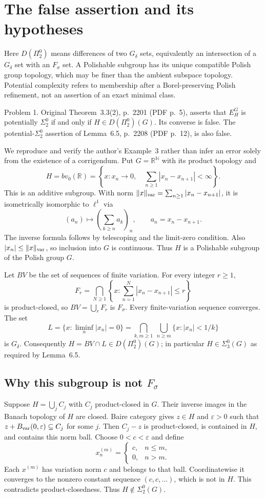 \documentclass[10pt]{article}
\begin{document}
\section*{The false assertion and its hypotheses}
Here \(D(\Pi^0_2)\) means differences of two \(G_\delta\) sets, equivalently an intersection of a \(G_\delta\) set with an \(F_\sigma\) set. A Polishable subgroup has its unique compatible Polish group topology, which may be finer than the ambient subspace topology. Potential complexity refers to membership after a Borel-preserving Polish refinement, not an assertion of an exact minimal class.\par
Problem 1.  Original Theorem 3.3(2), p. 2201 (PDF p. 5), asserts that \(E_H^G\) is potentially \(\Sigma^0_2\) if and only if \(H\in D(\Pi^0_2)(G)\). Its converse is false. The potential-\(\Sigma^0_2\) assertion of Lemma 6.5, p. 2208 (PDF p. 12), is also false.\par
We reproduce and verify the author’s Example 3 rather than infer an error solely from the existence of a corrigendum. Put \(G=\mathbb R^{\mathbb N}\) with its product topology and \[H=bv_0(\mathbb R)=
 \left\{x:x_n\longrightarrow0,\quad
              \sum_{n\ge1}|x_n-x_{n+1}|<\infty\right\}.\] This is an additive subgroup. With norm \(\|x\|_{\rm var}=\sum_{n\ge1}|x_n-x_{n+1}|\), it is isometrically isomorphic to \(\ell^1\) via \[(a_n)\longmapsto\left(\sum_{k\ge n}a_k\right)_n,
 \qquad a_n=x_n-x_{n+1}.\] The inverse formula follows by telescoping and the limit-zero condition. Also \(|x_n|\leq\|x\|_{\rm var}\), so inclusion into \(G\) is continuous. Thus \(H\) is a Polishable subgroup of the Polish group \(G\).\par
Let \(BV\) be the set of sequences of finite variation. For every integer \(r\ge1\), \[F_r=\bigcap_{N\ge1}
 \left\{x:\sum_{n=1}^{N}|x_n-x_{n+1}|\leq r\right\}\] is product-closed, so \(BV=\bigcup_r F_r\) is \(F_\sigma\). Every finite-variation sequence converges. The set \[L=\{x:\liminf_n|x_n|=0\}
   =\bigcap_{k,m\ge1}\ \bigcup_{n\ge m}\{x:|x_n|<1/k\}\] is \(G_\delta\). Consequently \(H=BV\cap L\in D(\Pi^0_2)(G)\); in particular \(H\in\Sigma^0_3(G)\) as required by Lemma 6.5.\par
\subsection*{Why this subgroup is not \(F_\sigma\)}
Suppose \(H=\bigcup_j C_j\) with \(C_j\) product-closed in \(G\). Their inverse images in the Banach topology of \(H\) are closed. Baire category gives \(z\in H\) and \(\varepsilon>0\) such that \(z+B_{\rm var}(0,\varepsilon)\subseteq C_j\) for some \(j\). Then \(C_j-z\) is product-closed, is contained in \(H\), and contains this norm ball. Choose \(0<c<\varepsilon\) and define \[x^{(m)}_n=
 \begin{cases}c,&n\leq m,\\0,&n>m.\end{cases}\] Each \(x^{(m)}\) has variation norm \(c\) and belongs to that ball. Coordinatewise it converges to the nonzero constant sequence \((c,c,\ldots)\), which is not in \(H\). This contradicts product-closedness. Thus \(H\notin\Sigma^0_2(G)\).\par
\end{document}
